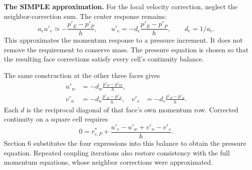 \textbf{The SIMPLE approximation.} For the local velocity correction,
neglect the neighbor-correction sum. The center response remains:
\[
a_eu'_e\simeq-\frac{p'_E-p'_P}{h},\qquad
\boxed{u'_e=-d_e\frac{p'_E-p'_P}{h}},\qquad d_e=1/a_e.
\]
This approximates the momentum response to a pressure increment. It does not
remove the requirement to conserve mass. The pressure equation is chosen so
that the resulting face corrections satisfy every cell's continuity balance.

The same construction at the other three faces gives
\begin{align*}
u'_w&=-d_w\frac{p'_P-p'_W}{h},\\
v'_n&=-d_n\frac{p'_N-p'_P}{h},&
v'_s&=-d_s\frac{p'_P-p'_S}{h}.
\end{align*}
Each $d$ is the reciprocal diagonal of that face's own momentum row. Corrected
continuity on a square cell requires
\[
0=r_{c,P}^*+\frac{u'_e-u'_w+v'_n-v'_s}{h}.
\]
Section 6 substitutes the four expressions into this balance to obtain
the pressure equation. Repeated coupling iterations also restore consistency
with the full momentum equations, whose neighbor corrections were approximated.
